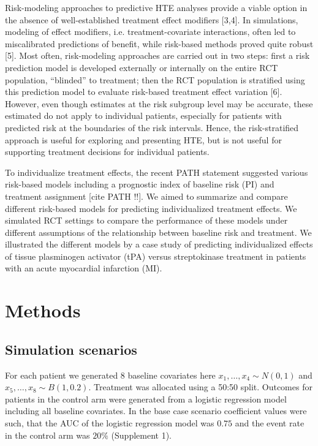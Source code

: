 \documentclass{article}
\begin{document}
Risk-modeling approaches to predictive HTE analyses provide a viable
option in the absence of well-established treatment effect modifiers
{[}3,4{]}. In simulations, modeling of effect modifiers, i.e.
treatment-covariate interactions, often led to miscalibrated predictions
of benefit, while risk-based methods proved quite robust {[}5{]}. Most
often, risk-modeling approaches are carried out in two steps: first a
risk prediction model is developed externally or internally on the
entire RCT population, ``blinded'' to treatment; then the RCT population
is stratified using this prediction model to evaluate risk-based
treatment effect variation {[}6{]}. However, even though estimates at
the risk subgroup level may be accurate, these estimated do not apply to
individual patients, especially for patients with predicted risk at the
boundaries of the risk intervals. Hence, the risk-stratified approach is
useful for exploring and presenting HTE, but is not useful for
supporting treatment decisions for individual patients.

To individualize treatment effects, the recent PATH statement suggested
various risk-based models including a prognostic index of baseline risk
(PI) and treatment assignment {[}cite PATH !!{]}. We aimed to summarize
and compare different risk-based models for predicting individualized
treatment effects. We simulated RCT settings to compare the performance
of these models under different assumptions of the relationship between
baseline risk and treatment. We illustrated the different models by a
case study of predicting individualized effects of tissue plasminogen
activator (tPA) versus streptokinase treatment in patients with an acute
myocardial infarction (MI).

\hypertarget{methods}{%
\section{Methods}\label{methods}}

\hypertarget{simulation-scenarios}{%
\subsection{Simulation scenarios}\label{simulation-scenarios}}

For each patient we generated 8 baseline covariates here
\(x_1,\dots,x_4\sim N(0, 1)\) and \(x_5,\dots,x_8\sim B(1, 0.2)\).
Treatment was allocated using a 50:50 split. Outcomes for patients in
the control arm were generated from a logistic regression model
including all baseline covariates. In the base case scenario coefficient
values were such, that the AUC of the logistic regression model was
\(0.75\) and the event rate in the control arm was \(20\%\) (Supplement
1).
\end{document}
